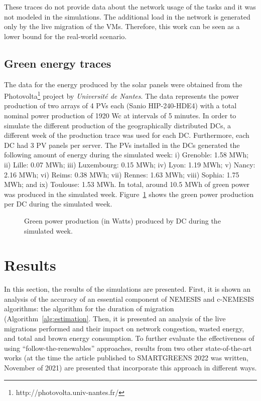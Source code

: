 These traces do not provide data about the network usage of the tasks and it was not modeled in the simulations. The additional load in the network is generated only by the live migration of the VMs. Therefore, this work can be seen as a lower bound for the real-world scenario. 

\subsection{Green energy traces}

The data for the energy produced by the solar panels were obtained from the Photovolta\footnote{http://photovolta.univ-nantes.fr/} project by \textit{Université de Nantes}. The data represents the power production of two arrays of 4 PVs each (Sanio HIP-240-HDE4) with a total nominal power production of 1920 Wc at intervals of 5 minutes. In order to simulate the different production of the geographically distributed DCs,  a different week of the production trace was used for each DC. Furthermore, each DC had 3 PV panels per server. The PVs installed in the DCs generated the following amount of energy during the simulated week: i) Grenoble: 1.58 MWh; ii) Lille: 0.07 MWh; iii) Luxembourg: 0.15 MWh; iv) Lyon: 1.19 MWh; v) Nancy: 2.16 MWh; vi) Reims: 0.38 MWh; vii) Rennes: 1.63 MWh; viii) Sophia: 1.75 MWh; and ix) Toulouse: 1.53 MWh. In total, around 10.5 MWh of green power was produced in the simulated week. Figure~\ref{fig:green_power} shows the green power production per DC during the simulated week.

 \begin{figure}[!htbp]
  \centering
   {}
  \caption{Green power production (in Watts) produced by DC during the
  simulated week.}
  \label{fig:green_power}
\end{figure}



\section{Results}

\label{sec:results_smargreens}

In this section,  the results of the simulations are presented. First, it is shown an analysis of the accuracy of an essential component of NEMESIS and c-NEMESIS algorithms: the algorithm for the duration of migration (Algorithm~\ref{alg:estimation}. Then,  it is presented an analysis of the live migrations performed and their impact on network congestion, wasted energy, and total and brown energy consumption. To further evaluate the effectiveness of using ``follow-the-renewables'' approaches, results from two other state-of-the-art works (at the time the article published to SMARTGREENS 2022 was written, November of 2021) are presented that incorporate this approach in different ways.


